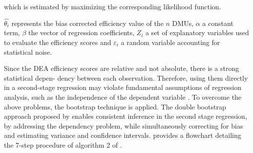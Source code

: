 which is estimated by maximizing the corresponding likelihood function.

$\hat{\theta_i}$ represents the bias corrected efficiency value of the $n$ DMUs, $\alpha$ a constant term, $\beta$ the vector of
regression coefficients, $Z_i$ a set of explanatory variables used to evaluate the efficiency scores and $\varepsilon_i$ a
random variable accounting for statistical noise. 

Since the DEA efficiency scores are relative and not absolute, there is a strong statistical depen-
dency between each observation. Therefore, using them directly in a second-stage regression may
violate fundamental assumptions of regression analysis, such as the independence of the dependent
variable \cite{simar2007}. 
To overcome the above problems, the bootstrap technique is applied. 
The double bootstrap approach proposed
by \cite{simar2007} enables consistent inference in the second stage regression, by addressing
the dependency problem, while simultaneously correcting for bias and estimating variance and confidence intervals.   provides a flowchart detailing the 7-step procedure of algorithm 2 of \cite{simar2007}.


